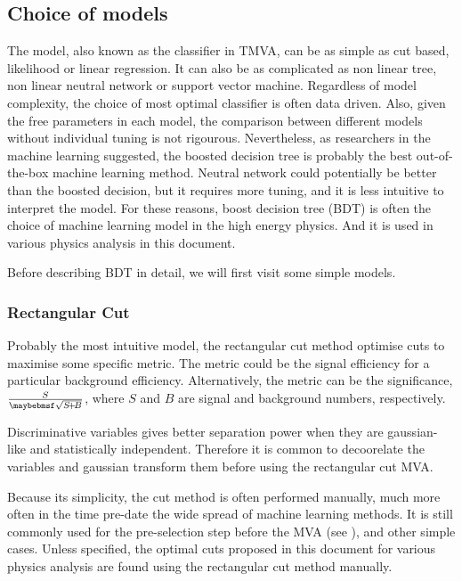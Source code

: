 \subsection{Choice of models}

The model, also known as the classifier in TMVA, can be as simple as cut based, likelihood or linear regression. It can also be as complicated as non linear tree, non linear neutral network or support vector machine. Regardless of model complexity, the choice of most optimal classifier is often data driven. Also, given the free parameters in each model, the comparison between different models without individual tuning is not rigourous. Nevertheless, as researchers in the machine learning suggested, the boosted decision tree is probably the best out-of-the-box machine learning method. Neutral network could potentially be better than the boosted decision, but it requires more tuning, and it is less intuitive to interpret the model. For these reasons, boost decision tree (BDT) is often the choice of machine learning model in the high energy physics. And it is used in various physics analysis in this document.

Before describing BDT in detail, we will first visit some simple models.


\subsubsection{Rectangular Cut}

Probably the most intuitive model, the rectangular cut method optimise cuts to maximise some specific metric. The metric could be the signal efficiency for a particular background efficiency. Alternatively, the metric can be the significance, $\frac{S}{\rootOf{S\!+\!B}}$, where $S$ and $B$ are signal and background numbers, respectively.

Discriminative variables gives better separation power when they are gaussian-like and statistically independent. Therefore it is common to decoorelate  the variables and gaussian transform them before using the rectangular cut MVA.

Because its simplicity, the cut method is often performed manually, much more often in the time pre-date the wide spread of machine learning methods. It is still commonly used for the pre-selection step before the MVA (see ), and other simple cases. Unless specified, the optimal cuts proposed in this document for various physics analysis are found using the rectangular cut method manually.

